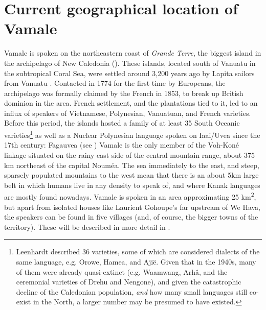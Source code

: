 \section{Current geographical location of Vamale}
\label{sec:place}
Vamale is spoken on the northeastern coast of \textit{Grande Terre}, the biggest island in the archipelago of New Caledonia (). These islands, located south of Vanuatu in the subtropical Coral Sea, were settled around 3,200 years ago by Lapita sailors from Vanuatu \parencites[334]{lynch_efate-erromango_2004}[309]{sand_what_2007}. Contacted in 1774 for the first time by Europeans, the archipelago was formally claimed by the French in 1853, to break up British dominion in the area. French settlement, and the plantations tied to it, led to an influx of speakers of Vietnamese, Polynesian, Vanuatuan, and French varieties. Before this period, the islands hosted a family of at least 35 South Oceanic varieties\footnote{Leenhardt described 36 varieties, some of which are considered dialects of the same language, e.g. Orowe, Hamea, and Ajië. Given that in the 1940s, many of them were already quasi-extinct (e.g. Waamwang, Arhâ, and the ceremonial varieties of Drehu and Nengone), and given the catastrophic decline of the Caledonian population, \textit{and} how many small languages still co-exist in the North, a larger number may be presumed to have existed.} as well as a Nuclear Polynesian language spoken on Iaai/Uvea since the 17th century: Fagauvea (see )
Vamale is the only member of the Voh-Koné linkage situated on the rainy east side of the central mountain range, about 375 km northeast of the capital Nouméa. The sea immediately to the east, and steep, sparsely populated mountains to the west mean that there is an about 5km large belt in which humans live in any density to speak of, and where Kanak languages are mostly found nowadays. Vamale is spoken in an area approximating 25 km\textsuperscript{2}, but apart from isolated houses like Laurient Gohoupe's far upstream of We Hava, the speakers can be found in five villages (and, of course, the bigger towns of the territory). These will be described in more detail in .


\label{ssec:Geo}



